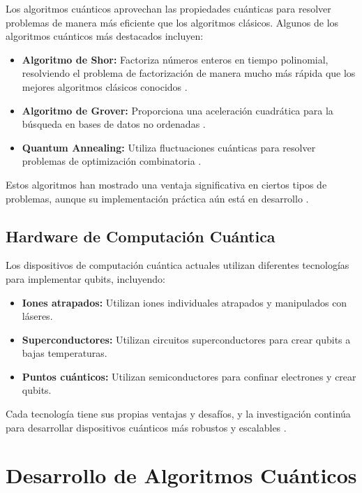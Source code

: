 \documentclass[11pt,a4paper,spanish]{book}
\begin{document}
Los algoritmos cuánticos aprovechan las propiedades cuánticas para resolver problemas de manera más eficiente que los algoritmos clásicos. Algunos de los algoritmos cuánticos más destacados incluyen:

\begin{itemize}
	\item \textbf{Algoritmo de Shor:} Factoriza números enteros en tiempo polinomial, resolviendo el problema de factorización de manera mucho más rápida que los mejores algoritmos clásicos conocidos \cite{shorAlgorithm}.
	\item \textbf{Algoritmo de Grover:} Proporciona una aceleración cuadrática para la búsqueda en bases de datos no ordenadas \cite{groverAlgorithm}.
	\item \textbf{Quantum Annealing:} Utiliza fluctuaciones cuánticas para resolver problemas de optimización combinatoria \cite{farhiQuantum}.
\end{itemize}

Estos algoritmos han mostrado una ventaja significativa en ciertos tipos de problemas, aunque su implementación práctica aún está en desarrollo \cite{nielsenChuang}.

\subsection{Hardware de Computación Cuántica}

Los dispositivos de computación cuántica actuales utilizan diferentes tecnologías para implementar qubits, incluyendo:

\begin{itemize}
	\item \textbf{Iones atrapados:} Utilizan iones individuales atrapados y manipulados con láseres.
	\item \textbf{Superconductores:} Utilizan circuitos superconductores para crear qubits a bajas temperaturas.
	\item \textbf{Puntos cuánticos:} Utilizan semiconductores para confinar electrones y crear qubits.
\end{itemize}

Cada tecnología tiene sus propias ventajas y desafíos, y la investigación continúa para desarrollar dispositivos cuánticos más robustos y escalables \cite{gibneyQuantumTech}.

\section{Desarrollo de Algoritmos Cuánticos}
\end{document}
